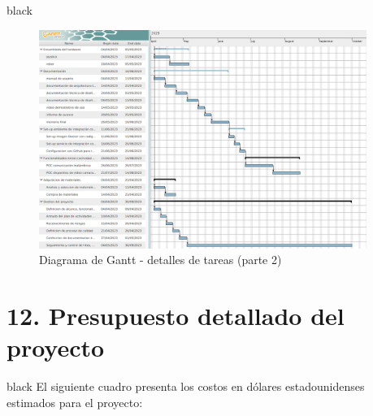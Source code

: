 \documentclass[
11pt, %
]{charter}
\begin{document}
\begin{consigna}{black}
\begin{figure}[htpb]
\centering 
\includegraphics[width=0.95\textwidth]{./Figuras/gantt-part-2.png}
\caption{Diagrama de Gantt - detalles de tareas (parte 2)}
\label{fig:diagGantt}
\end{figure}

\end{consigna}

\section{12. Presupuesto detallado del proyecto}
\label{sec:presupuesto}

\begin{consigna}{black}
El siguiente cuadro presenta los costos en dólares estadounidenses estimados para el proyecto:

\end{consigna}
\end{document}
